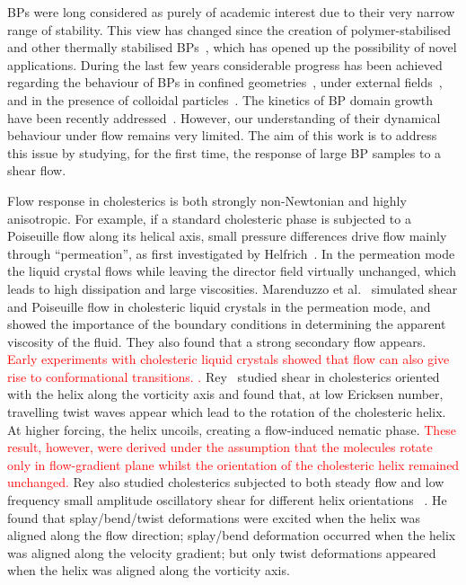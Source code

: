 \documentclass[8.5pt,twoside,twocolumn]{article}
\newcommand{\rev}[1]{{\textcolor{red}{#1}}}
\begin{document}
BPs were long considered as purely of academic interest due to their very narrow 
range of stability. This view has changed since the creation of polymer-stabilised and other thermally 
stabilised BPs~\cite{Kikuchi:2002,Coles:2005}, which has opened up the 
possibility of novel applications.
During the last few years considerable progress has been achieved regarding the behaviour 
of BPs in confined geometries~\cite{Fukuda:2010a, Fukuda:2010b, Ravnik:2011b}, under 
external fields~\cite{Alexander:2008,Fukuda:2009,Henrich:2010a,Castles:2010,Tiribocchi:2011a}, 
and in the presence of colloidal particles~\cite{Ravnik:2011a}.
The kinetics of BP domain growth have been recently addressed~\cite{Henrich:2010b}. 
However, our understanding of their dynamical behaviour under flow remains
very limited. The aim of this work is to address this issue by studying,
for the first time, the response of large BP samples to a shear flow.

Flow response in cholesterics is both strongly non-Newtonian and highly anisotropic.
For example, if a standard cholesteric phase is subjected to a Poiseuille flow along
its helical axis, small pressure differences drive flow mainly through
``permeation'', as first investigated by Helfrich~\cite{Helfrich:1969}.
In the permeation mode the liquid crystal flows while leaving the director
field virtually unchanged, which leads to high dissipation and large
viscosities. Marenduzzo et al.~\cite{Marenduzzo:2006a,Marenduzzo:2006b} simulated 
shear and Poiseuille flow in cholesteric liquid crystals in the permeation mode, and 
showed the importance of the boundary conditions in determining the apparent viscosity of the fluid. 
They also found that a strong secondary flow appears.
\rev{
Early experiments with cholesteric liquid crystals
showed that flow can also give rise to conformational transitions. \cite{Press:1978}.
}
Rey~\cite{Rey:1996a, Rey:1996b} studied shear in cholesterics oriented with the helix along 
the vorticity axis and found that, at low Ericksen number, travelling twist waves appear which 
lead to the rotation of the cholesteric helix. At higher forcing, the helix uncoils, creating a flow-induced nematic phase. 
\rev{
These result, however, were derived under the 
assumption that the molecules rotate only in flow-gradient plane whilst
the orientation of the cholesteric helix remained unchanged.
}  
Rey also studied cholesterics subjected to both steady flow and low frequency
small amplitude oscillatory shear for different helix orientations
~\cite{Rey:2000, Rey:2002}. He found that splay/bend/twist deformations were
excited when the helix was aligned along the flow direction; splay/bend
deformation occurred when the helix was aligned along the velocity gradient;
but only twist deformations
appeared when the helix was aligned along the vorticity axis.
\end{document}
